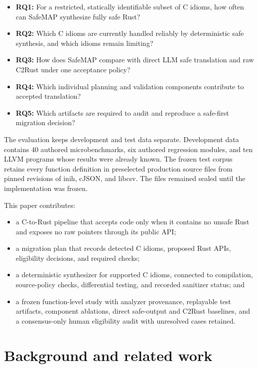 \documentclass[conference]{IEEEtran}
\newcommand{\tool}{SafeMAP\xspace}
\begin{document}
\begin{itemize}
  \item \textbf{RQ1:} For a restricted, statically identifiable subset of C
  idioms, how often can \tool synthesize fully safe Rust?
  \item \textbf{RQ2:} Which C idioms are currently handled reliably by
  deterministic safe synthesis, and which idioms remain limiting?
  \item \textbf{RQ3:} How does \tool compare with direct LLM safe translation
  and raw C2Rust under one acceptance policy?
  \item \textbf{RQ4:} Which individual planning and validation components
  contribute to accepted translation?
  \item \textbf{RQ5:} Which artifacts are required to audit and reproduce a
  safe-first migration decision?
\end{itemize}

The evaluation keeps development and test data separate. Development data
contains 40 authored microbenchmarks, six authored regression modules, and ten
LLVM programs whose results were already known. The frozen test corpus retains
every function definition in preselected production source files from pinned
revisions of inih, cJSON, and libcsv. The files remained sealed until the
implementation was frozen.

This paper contributes:

\begin{itemize}
  \item a C-to-Rust pipeline that accepts code only when it contains no unsafe
  Rust and exposes no raw pointers through its public API;
  \item a migration plan that records detected C idioms, proposed Rust APIs,
  eligibility decisions, and required checks;
  \item a deterministic synthesizer for supported C idioms, connected to
  compilation, source-policy checks, differential testing, and recorded
  sanitizer status; and
  \item a frozen function-level study with analyzer provenance, replayable test
  artifacts, component ablations, direct safe-output and C2Rust baselines, and
  a consensus-only human eligibility audit with unresolved cases retained.
\end{itemize}

\section{Background and related work}
\end{document}
